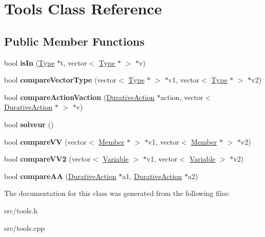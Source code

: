 \hypertarget{classTools}{\section{Tools Class Reference}
\label{classTools}
}
\subsection*{Public Member Functions}
\begin{DoxyCompactItemize}
\item 
\hypertarget{classTools_a82964e604c52b7a2250e8a5291fae80d}{bool {\bfseries is\+In} (\hyperlink{classType}{Type} $\ast$t, vector$<$ \hyperlink{classType}{Type} $\ast$ $>$ $\ast$v)}\label{classTools_a82964e604c52b7a2250e8a5291fae80d}

\item 
\hypertarget{classTools_a133831bc0b6c2c426a2beef303fe31d8}{bool {\bfseries compare\+Vector\+Type} (vector$<$ \hyperlink{classType}{Type} $\ast$ $>$ $\ast$v1, vector$<$ \hyperlink{classType}{Type} $\ast$ $>$ $\ast$v2)}\label{classTools_a133831bc0b6c2c426a2beef303fe31d8}

\item 
\hypertarget{classTools_a41b2b26e2a03197393e19907c4ab604b}{bool {\bfseries compare\+Action\+Vaction} (\hyperlink{classDurativeAction}{Durative\+Action} $\ast$action, vector$<$ \hyperlink{classDurativeAction}{Durative\+Action} $\ast$ $>$ $\ast$v)}\label{classTools_a41b2b26e2a03197393e19907c4ab604b}

\item 
\hypertarget{classTools_a3e90b6d57c7bf280e371c866c74a804a}{bool {\bfseries solveur} ()}\label{classTools_a3e90b6d57c7bf280e371c866c74a804a}

\item 
\hypertarget{classTools_a3f0feaba003f037f5b45deb00b92099a}{bool {\bfseries compare\+V\+V} (vector$<$ \hyperlink{classMember}{Member} $\ast$ $>$ $\ast$v1, vector$<$ \hyperlink{classMember}{Member} $\ast$ $>$ $\ast$v2)}\label{classTools_a3f0feaba003f037f5b45deb00b92099a}

\item 
\hypertarget{classTools_a23ceae792d59f3abef350ab494b72953}{bool {\bfseries compare\+V\+V2} (vector$<$ \hyperlink{classVariable}{Variable} $>$ $\ast$v1, vector$<$ \hyperlink{classVariable}{Variable} $>$ $\ast$v2)}\label{classTools_a23ceae792d59f3abef350ab494b72953}

\item 
\hypertarget{classTools_af42bb5747bc322664a12860aae3959fc}{bool {\bfseries compare\+A\+A} (\hyperlink{classDurativeAction}{Durative\+Action} $\ast$a1, \hyperlink{classDurativeAction}{Durative\+Action} $\ast$a2)}\label{classTools_af42bb5747bc322664a12860aae3959fc}

\end{DoxyCompactItemize}


The documentation for this class was generated from the following files\+:\begin{DoxyCompactItemize}
\item 
src/tools.\+h\item 
src/tools.\+cpp\end{DoxyCompactItemize}
